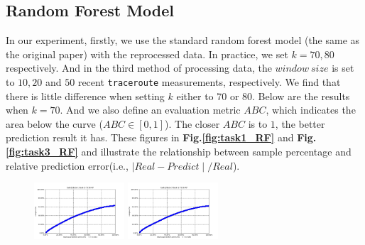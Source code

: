 \documentclass[sigconf]{acmart}
\begin{document}
\subsection{Random Forest Model}
In our experiment, firstly, we use the standard random forest model (the same as the original paper) with the reprocessed data.  In practice, we set $k = 70, 80$ respectively. And in the third method of processing data, the $window\ size$ is set to $10,20$ and $50$ recent \texttt{traceroute} measurements, respectively. We find that there is little difference when setting $k$ either to 70 or 80. Below are the results when $k = 70$. And we also define an evaluation metric $ABC$, which indicates the  area below the curve ($ABC\in[0,1]$). The closer $ABC$ is to $1$, the better prediction result it has. These figures in \textbf{Fig.\ref{fig:task1_RF}} and \textbf{Fig.\ref{fig:task3_RF}} and  illustrate the relationship between sample percentage and relative prediction error(i.e., $\mid Real - Predict\mid/ Real $). 
\begin{figure} [!htb] 
	\centering  
	\includegraphics[width=0.3\textwidth]{fig4/data-1-task-1-7030-RF.jpg}  
	\includegraphics[width=0.3\textwidth]{fig4/data-2-task-1-7030-RF.jpg} 
\end{figure} 
\end{document}
